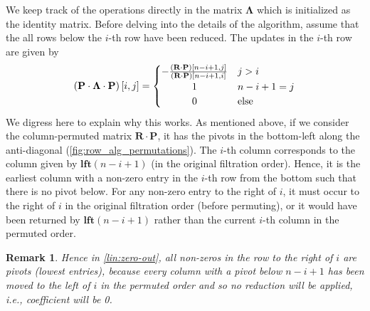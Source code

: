 \documentclass[10pt,a4paper]{article}
\newtheorem{remark}[theorem]{Remark}
\newcommand{\mat}[1]{\mathbf{#1}}
\newcommand{\low}{\mathbf{low}}
\newcommand{\lft}{\mathbf{lft}}
\DeclareMathOperator*{\argmin}{arg\,min}
\begin{document}
We keep track of the operations directly in the matrix $\mat{\Lambda}$ which is initialized as the identity matrix. %
Before delving into the details of the algorithm, assume that the all rows below the $i$-th row have been reduced. The updates in the $i$-th row are given by 
\[
    \left( \mat{P} \cdot \mat{\Lambda} \cdot \mat{P} \right)[i,j] =
        \begin{cases}
            -\frac{(\mat{R}\cdot \mat{P})[n-i+1,j]}{(\mat{R}\cdot \mat{P})[n-i+1,i]} &   j>i\\
            \hfil  1&n-i+1=j \\
            \hfil  0 &\mbox{else}
        \end{cases}
\]
We digress here to explain why this works. As mentioned above, if we consider the column-permuted matrix $\mat{R}\cdot \mat{P}$, it has the pivots in the bottom-left along the anti-diagonal (\cref{fig:row_alg_permutations}). The $i$-th column corresponds to the column given by $\lft  (n-i+1)$ (in the original filtration order). Hence, it is the earliest column with a non-zero entry in the $i$-th row from the bottom such that there is no pivot below. 
   For any non-zero entry to the right of $i$, it must occur to the right of $i$  in the original filtration order (before permuting), or it would have been returned by $\lft  (n-i+1)$ rather than the current $i$-th column in the permuted order. 
\begin{remark}
    \label{rem:pivots}
   Hence in \cref{lin:zero-out},  all non-zeros in the row to the right of $i$ are  pivots (lowest entries), because every column with a pivot below $n-i+1$ has been moved to the left of $i$ in the permuted order and so no reduction will be applied, i.e., coefficient will be 0.
\end{remark}
\end{document}
